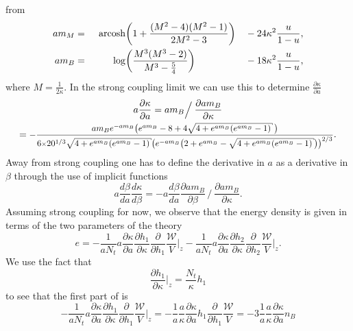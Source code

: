 from \citep{Langelage:2014vpa}
%
\begin{alignat}{99}
  a m_M &{}={}& \,\acosh &\bigg(1 + \frac{(M^2 - 4)(M^2 - 1)}{2M^2 - 3}\bigg) &&- 24 \kappa^2 \frac{u}{1-u},\\
  a m_B &{}={}& \log &\bigg(\frac{M^3(M^3 - 2)}{M^3 - \frac{5}{4}}\bigg) &&- 18
  \kappa^2 \frac{u}{1-u},
\end{alignat}
%
where $M = \frac{1}{2 \kappa}$. In the strong coupling limit we can use this
to determine $\frac{\partial \kappa}{\partial a}$
%
\begin{multline}
  a \frac{\partial \kappa}{\partial a} = a m_B \Big/
    \:\frac{\partial a m_B}{\partial \kappa} \\
  = \scalemath{0.9}{%
    -\frac{%
        a m_B e^{-a m_B} \big( e^{a m_B} - 8 + 4 \sqrt{4 + e^{a m_B} (e^{a m_B} - 1)} \,\big)%
      }{%
        6 \scalemath{0.8}{\times} 20^{1/3} \sqrt{4 + e^{a m_B} (e^{a m_B} - 1)}
        \big(e^{-a m_B} \big( 2 + e^{a m_B} - \sqrt{4 + e^{a m_B} (e^{a m_B} - 1)} \big) \big)^{2/3}
      }}.
\end{multline}
%
Away from strong coupling one has to define the derivative in $a$ as a
derivative in $\beta$ through the use of implicit functions
%
\begin{equation}
  a \frac{d \beta}{d a} \frac{d \kappa}{d \beta} = - a \frac{d \beta}{d a}
  \frac{\partial a m_B}{\partial \beta} \,\Big/ \:
  \frac{\partial a m_B}{\partial \kappa}.
\end{equation}
%
Assuming strong coupling for now, we observe that the energy density is given in
terms of the two parameters of the theory
%
\begin{equation} \label{eq:energy_dens_mid_calc}
  e =  -\frac{1}{a N_t} a\frac{\partial \kappa}{\partial a}
    \frac{\partial h_1}{\partial \kappa} \frac{\partial}{\partial h_1}
    \frac{\mathcal{W}}{V} \bigg|_z
  -\frac{1}{a N_t} a\frac{\partial \kappa}{\partial a}
    \frac{\partial h_2}{\partial \kappa} \frac{\partial}{\partial h_2}
    \frac{\mathcal{W}}{V} \bigg|_z.
\end{equation}
%
We use the fact that
%
\begin{equation}
  \frac{\partial h_1}{\partial \kappa} \bigg|_z = \frac{N_t}{\kappa} h_1
\end{equation}
%
to see that the first part of  is
%
\begin{equation}
  -\frac{1}{a N_t} a\frac{\partial \kappa}{\partial a}
    \frac{\partial h_1}{\partial \kappa} \frac{\partial}{\partial h_1}
    \frac{\mathcal{W}}{V} \bigg|_z
  = - \frac{1}{a} \frac{a}{\kappa} \frac{\partial \kappa}{\partial a} h_1
  \frac{\partial}{\partial h_1} \frac{\mathcal{W}}{V}
  = -3 \frac{1}{a} \frac{a}{\kappa} \frac{\partial \kappa}{\partial a} n_B
\end{equation}
